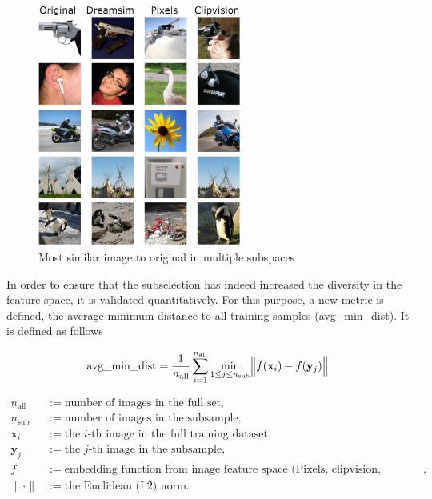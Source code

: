 \begin{figure}[ht]
  \centering
  \includegraphics[width=0.6\textwidth]{plots/dropout_similarity_plot.JPEG}
  \caption{Most similar image to original in multiple subspaces}\label{fig:dropout_similarity_plot}
\end{figure}

In order to ensure that the subselection has indeed increased the diversity in the feature space, it is validated quantitatively. For this purpose, a new metric is defined, the average minimum distance to all training samples (avg\_min\_dist). It is defined as follows

\[
\text{avg\_min\_dist}
= \frac{1}{n_{\text{all}}}
  \sum_{i=1}^{n_{\text{all}}}
    \min_{1 \le j \le n_{\text{sub}}}
      \Bigl\lVert f(\mathbf{x}_i) - f(\mathbf{y}_j) \Bigr\rVert
\]

\[
\begin{aligned}
n_{\text{all}} &:=
  \text{number of images in the full set}, \\
n_{\text{sub}} &:=
  \text{number of images in the subsample}, \\
\mathbf{x}_i &:=
  \text{the $i$-th image in the full training dataset}, \\
\mathbf{y}_j &:=
  \text{the $j$-th image in the subsample}, \\
f &:=
  \text{embedding function from image feature space (Pixels, clipvision, dreamsim)}, \\
\|\cdot\| &:=
  \text{the Euclidean (L2) norm}.
\end{aligned}
\]

